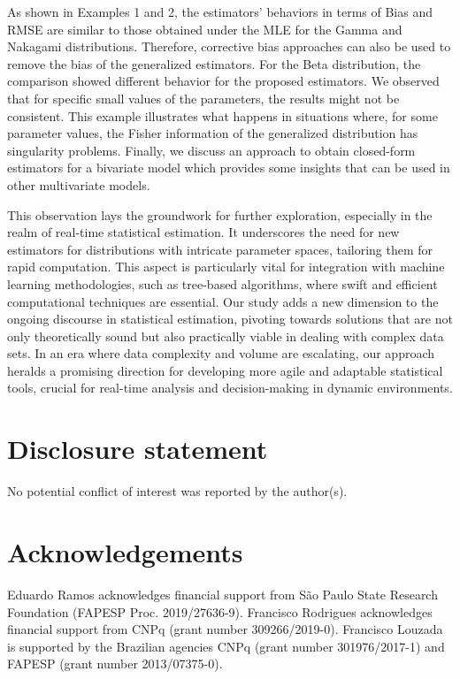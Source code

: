\documentclass[10pt,a4paper,onecolumn]{article} %
\begin{document}
As shown in Examples 1 and 2, the estimators' behaviors in terms of Bias and RMSE are similar to those obtained under the MLE for the Gamma and Nakagami distributions. Therefore, corrective bias approaches can also be used to remove the bias of the generalized estimators. For the Beta distribution, the comparison showed different behavior for the proposed estimators. We observed that for specific small values of the parameters, the results might not be consistent. This example illustrates what happens in situations where, for some parameter values, the Fisher information of the generalized distribution has singularity problems. Finally, we discuss an approach to obtain closed-form estimators for a bivariate model which provides some insights that can be used in other multivariate models.



This observation lays the groundwork for further exploration, especially in the realm of real-time statistical estimation. It underscores the need for new estimators for distributions with intricate parameter spaces, tailoring them for rapid computation. This aspect is particularly vital for integration with machine learning methodologies, such as tree-based algorithms, where swift and efficient computational techniques are essential. Our study adds a new dimension to the ongoing discourse in statistical estimation, pivoting towards solutions that are not only theoretically sound but also practically viable in dealing with complex data sets. In an era where data complexity and volume are escalating, our approach heralds a promising direction for developing more agile and adaptable statistical tools, crucial for real-time analysis and decision-making in dynamic environments.


\section*{Disclosure statement}

No potential conflict of interest was reported by the author(s).


\section*{Acknowledgements}

 Eduardo Ramos acknowledges financial support from S\~ao Paulo State Research Foundation (FAPESP Proc. 2019/27636-9). Francisco Rodrigues acknowledges financial support from CNPq (grant number 309266/2019-0). Francisco Louzada is supported by the Brazilian agencies CNPq (grant number
301976/2017-1) and FAPESP (grant number 2013/07375-0).
\end{document}
